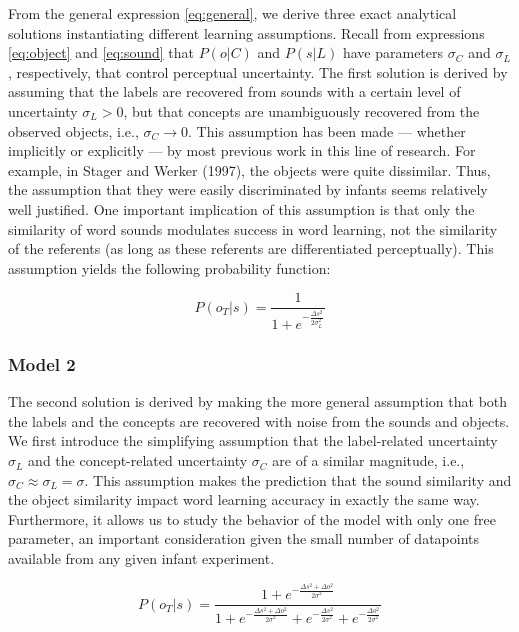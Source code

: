 \documentclass[english,,man,floatsintext]{apa6}
\theoremstyle{definition}
\theoremstyle{definition}
\theoremstyle{definition}
\theoremstyle{remark}
\begin{document}
From the general expression \ref{eq:general}, we derive three exact
analytical solutions instantiating different learning assumptions.
Recall from expressions \ref{eq:object} and \ref{eq:sound} that
\(P(o|C)\) and \(P(s|L)\) have parameters \(\sigma_C\) and \(\sigma_L\),
respectively, that control perceptual uncertainty. The first solution is
derived by assuming that the labels are recovered from sounds with a
certain level of uncertainty \(\sigma_L > 0\), but that concepts are
unambiguously recovered from the observed objects, i.e.,
\(\sigma_C \rightarrow 0\). This assumption has been made --- whether
implicitly or explicitly --- by most previous work in this line of
research. For example, in Stager and Werker (1997), the objects were
quite dissimilar. Thus, the assumption that they were easily
discriminated by infants seems relatively well justified. One important
implication of this assumption is that only the similarity of word
sounds modulates success in word learning, not the similarity of the
referents (as long as these referents are differentiated perceptually).
This assumption yields the following probability function:

\begin{equation} \label{eq:model1}
P(o_T|s)= \frac{1}{1 + e^{-\frac{\Delta s^2}{2\sigma_L^2}}}
\end{equation}

\subsubsection{Model 2}\label{model-2}

The second solution is derived by making the more general assumption
that both the labels and the concepts are recovered with noise from the
sounds and objects. We first introduce the simplifying assumption that
the label-related uncertainty \(\sigma_L\) and the concept-related
uncertainty \(\sigma_C\) are of a similar magnitude, i.e.,
\(\sigma_C \approx \sigma_L = \sigma\). This assumption makes the
prediction that the sound similarity and the object similarity impact
word learning accuracy in exactly the same way. Furthermore, it allows
us to study the behavior of the model with only one free parameter, an
important consideration given the small number of datapoints available
from any given infant experiment.

\begin{equation} \label{eq:model2}
P(o_T|s)= \frac{1 + e^{- \frac{\Delta s^2 + \Delta o^2}{2\sigma^2}}}{1 + e^{-\frac{\Delta s^2 + \Delta o^2}{2\sigma^2}}+ e^{-\frac{\Delta s^2}{2\sigma^2}} + e^{-\frac{\Delta o^2}{2\sigma^2}}}
\end{equation}
\end{document}
